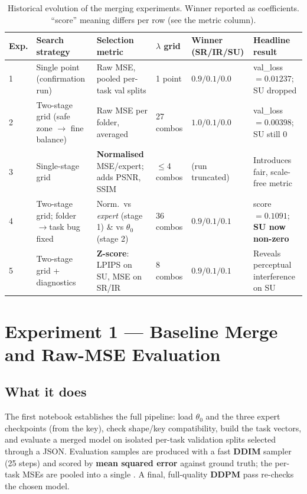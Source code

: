 \renewcommand{\arraystretch}{1.35}
\begin{table}[h]
\centering
\footnotesize
\caption{Historical evolution of the merging experiments. Winner reported as
\lam{}{}{} coefficients. ``score'' meaning differs per row (see the metric column).}
\label{tab:summary}
\begin{tabular}{@{}p{0.9cm} p{2.5cm} p{3.4cm} p{2.4cm} p{2.0cm} p{2.2cm}@{}}
\toprule
\textbf{Exp.} & \textbf{Search strategy} & \textbf{Selection metric} &
\textbf{$\lambda$ grid} & \textbf{Winner (SR/IR/SU)} & \textbf{Headline result} \\
\midrule
\rowcolor{rowgray}
1 & Single point (confirmation run) &
Raw MSE, pooled per-task val splits &
1 point &
$0.9/0.1/0.0$ &
val\_loss $=0.01237$; SU dropped \\

2 & Two-stage grid (safe zone $\to$ fine balance) &
Raw MSE per folder, averaged &
27 combos &
$1.0/0.1/0.0$ &
val\_loss $=0.00398$; SU still $0$ \\

\rowcolor{rowgray}
3 & Single-stage grid &
\textbf{Normalised} MSE/expert; adds PSNR, SSIM &
$\le$4 combos &
(run truncated) &
Introduces fair, scale-free metric \\

4 & Two-stage grid; folder$\to$task bug fixed &
Norm.\ vs \emph{expert} (stage 1) \& vs \emph{$\theta_0$} (stage 2) &
36 combos &
$0.9/0.1/0.1$ &
score $=0.1091$; \textbf{SU now non-zero} \\

\rowcolor{rowgray}
5 & Two-stage grid + diagnostics &
\textbf{Z-score}: LPIPS on SU, MSE on SR/IR &
8 combos &
$0.9/0.1/0.1$ &
Reveals perceptual interference on SU \\
\bottomrule
\end{tabular}
\end{table}

\section{Experiment 1 --- Baseline Merge and Raw-MSE Evaluation}

\subsection*{What it does}
The first notebook establishes the full pipeline: load $\theta_0$ and the three
expert checkpoints (from the  key), check shape/key
compatibility, build the task vectors, and evaluate a merged model on isolated
per-task validation splits selected through a  JSON.
Evaluation samples are produced with a fast \textbf{DDIM} sampler
(25 steps) and scored by \textbf{mean squared error} against ground truth;
the per-task MSEs are pooled into a single . A final,
full-quality \textbf{DDPM} pass re-checks the chosen model.

